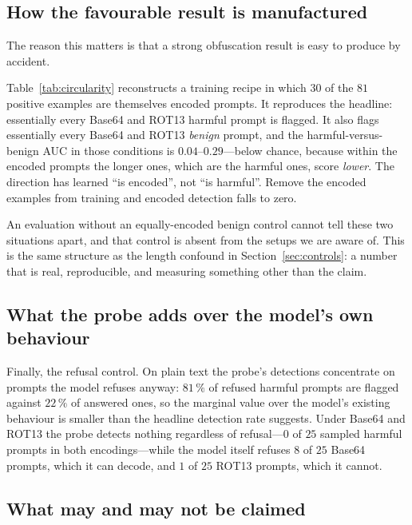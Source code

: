 

\subsection{How the favourable result is manufactured}
\label{sec:circularity}

The reason this matters is that a strong obfuscation result is easy to produce by accident.



Table~\ref{tab:circularity} reconstructs a training recipe in which $30$ of the $81$ positive examples are themselves
encoded prompts. It reproduces the headline: essentially every Base64 and ROT13 harmful prompt is flagged. It also
flags essentially every Base64 and ROT13 \emph{benign} prompt, and the harmful-versus-benign AUC in those conditions
is $0.04$--$0.29$---below chance, because within the encoded prompts the longer ones, which are the harmful ones,
score \emph{lower}. The direction has learned ``is encoded'', not ``is harmful''. Remove the encoded examples from
training and encoded detection falls to zero.

An evaluation without an equally-encoded benign control cannot tell these two situations apart, and that control is
absent from the setups we are aware of. This is the same structure as the length confound in
Section~\ref{sec:controls}: a number that is real, reproducible, and measuring something other than the claim.

\subsection{What the probe adds over the model's own behaviour}
\label{sec:obf_refusal}

Finally, the refusal control. On plain text the probe's detections concentrate on prompts the model refuses anyway:
$81\,\%$ of refused harmful prompts are flagged against $22\,\%$ of answered ones, so the marginal value over the
model's existing behaviour is smaller than the headline detection rate suggests. Under Base64 and ROT13 the probe
detects nothing regardless of refusal---$0$ of $25$ sampled harmful prompts in both encodings---while the model itself
refuses $8$ of $25$ Base64 prompts, which it can decode, and $1$ of $25$ ROT13 prompts, which it cannot.

\subsection{What may and may not be claimed}
\label{sec:obf_claims}

